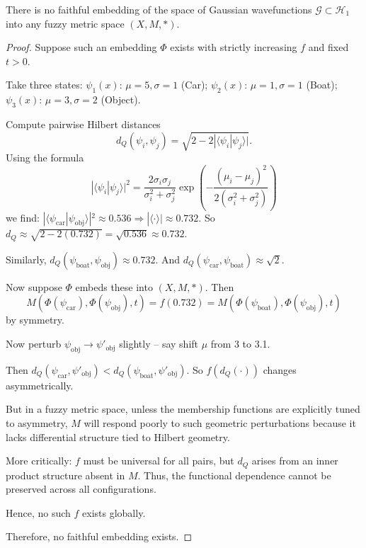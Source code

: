 \documentclass[10pt,a4paper]{amsart}
\begin{document}
\begin{theorem}
There is no faithful embedding of the space of Gaussian wavefunctions $\mathcal{G} \subset \mathcal{H}_1$ into any fuzzy metric space $(X,M,*)$.
\end{theorem}

\begin{proof}
Suppose such an embedding $\Phi$ exists with strictly increasing $f$ and fixed $t>0$.

Take three states:
$\psi_1(x)$: $\mu=5, \sigma=1$ (Car);
$\psi_2(x)$: $\mu=1, \sigma=1$ (Boat);
$\psi_3(x)$: $\mu=3, \sigma=2$ (Object).

Compute pairwise Hilbert distances
$$
d_Q(\psi_i,\psi_j) = \sqrt{2 - 2|\langle\psi_i|\psi_j\rangle|} .
$$
Using the  formula
$$
|\langle\psi_i|\psi_j\rangle|^2 = \frac{2\sigma_i\sigma_j}{\sigma_i^2 + \sigma_j^2} \exp\left(-\frac{(\mu_i - \mu_j)^2}{2(\sigma_i^2 + \sigma_j^2)}\right) 
$$
we find:
$|\langle\psi_{\text{car}}|\psi_{\text{obj}}\rangle|^2 \approx 0.536 \Rightarrow |\langle\cdot\rangle| \approx 0.732$.
 So $d_Q \approx \sqrt{2 - 2(0.732)} = \sqrt{0.536} \approx 0.732$.

Similarly, $d_Q(\psi_{\text{boat}},\psi_{\text{obj}}) \approx 0.732$.
And $d_Q(\psi_{\text{car}},\psi_{\text{boat}}) \approx \sqrt{2}$.

Now suppose $\Phi$ embeds these into $(X,M,*)$. Then
$$
M(\Phi(\psi_{\text{car}}), \Phi(\psi_{\text{obj}}), t) = f(0.732) = M(\Phi(\psi_{\text{boat}}), \Phi(\psi_{\text{obj}}), t)
$$
by symmetry.

Now perturb $\psi_{\text{obj}} \to \psi'_{\text{obj}}$ slightly -- say shift $\mu$ from 3 to 3.1.

Then $d_Q(\psi_{\text{car}}, \psi'_{\text{obj}}) < d_Q(\psi_{\text{boat}}, \psi'_{\text{obj}})$.
So $f(d_Q(\cdot))$ changes asymmetrically.

But in a fuzzy metric space, unless the membership functions are explicitly tuned to asymmetry, $M$ will respond poorly to such geometric perturbations because it lacks differential structure tied to Hilbert geometry.

More critically: $f$ must be universal for all pairs, but $d_Q$ arises from an inner product structure absent in $M$. Thus, the functional dependence cannot be preserved across all configurations.

Hence, no such $f$ exists globally.

Therefore, no faithful embedding exists.
\end{proof}
\end{document}
